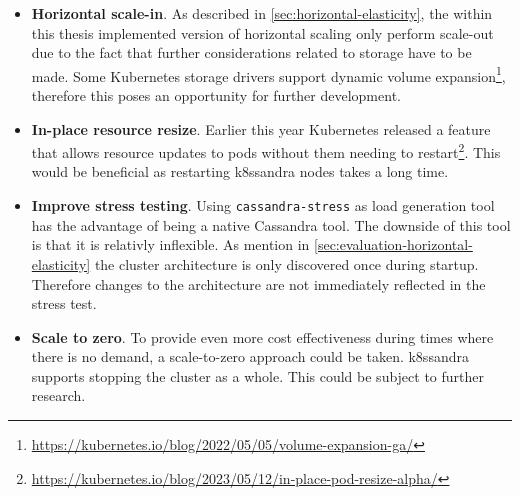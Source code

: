 \begin{itemize}
    \item \textbf{Horizontal scale-in}. As described in \cref{sec:horizontal-elasticity}, the within this thesis implemented version of horizontal scaling only perform scale-out due to the fact that further considerations related to storage have to be made. Some Kubernetes storage drivers support dynamic volume expansion\footnote{\url{https://kubernetes.io/blog/2022/05/05/volume-expansion-ga/}}, therefore this poses an opportunity for further development.

    \item \textbf{In-place resource resize}. Earlier this year Kubernetes released a feature that allows resource updates to pods without them needing to restart\footnote{\url{https://kubernetes.io/blog/2023/05/12/in-place-pod-resize-alpha/}}. This would be beneficial as restarting k8ssandra nodes takes a long time.

    \item \textbf{Improve stress testing}. Using \texttt{cassandra-stress} as load generation tool has the advantage of being a native Cassandra tool. The downside of this tool is that it is relativly inflexible. As mention in \cref{sec:evaluation-horizontal-elasticity} the cluster architecture is only discovered once during startup. Therefore changes to the architecture are not immediately reflected in the stress test.

    \item \textbf{Scale to zero}. To provide even more cost effectiveness during times where there is no demand, a scale-to-zero approach could be taken. k8ssandra supports stopping the cluster as a whole. This could be subject to further research.
\end{itemize}
